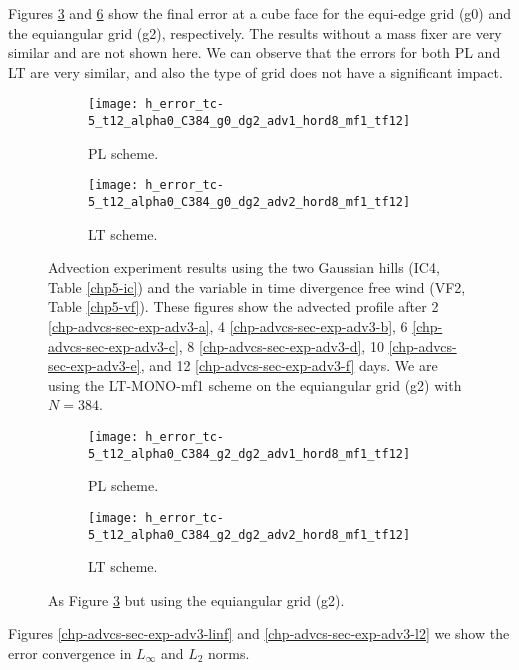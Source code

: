 Figures \ref{chp-advcs-sec-exp-adv3-errors-0} and \ref{chp-advcs-sec-exp-adv3-errors-2} show 
the final error at a cube face for the equi-edge grid (g0) and the equiangular grid (g2), respectively.
The results without a mass fixer are very similar and are not shown here. 
We can observe that the errors for both PL and LT are very similar, and also the type of grid does not have a significant impact.
\newpage
\begin{figure}[!htb]
	\centering
	\begin{subfigure}{0.45\textwidth}
		\centering
		\texttt{[image: h\_error\_tc-5\_t12\_alpha0\_C384\_g0\_dg2\_adv1\_hord8\_mf1\_tf12]}
		\caption{PL scheme.\label{chp-advcs-sec-exp-adv3-errors-0a}}
	\end{subfigure}
	\begin{subfigure}{0.45\textwidth}
		\centering
		\texttt{[image: h\_error\_tc-5\_t12\_alpha0\_C384\_g0\_dg2\_adv2\_hord8\_mf1\_tf12]}
		\caption{LT scheme.\label{chp-advcs-sec-exp-adv3-errors-0b}}
	\end{subfigure}
	\caption{
Advection experiment results using the two Gaussian hills  (IC4, Table \ref{chp5-ic}) and 
the variable in time divergence free wind (VF2, Table \ref{chp5-vf}).
These figures show the advected profile after
2 \eqref{chp-advcs-sec-exp-adv3-a}, 
4  \eqref{chp-advcs-sec-exp-adv3-b},
6  \eqref{chp-advcs-sec-exp-adv3-c},
8  \eqref{chp-advcs-sec-exp-adv3-d},
10  \eqref{chp-advcs-sec-exp-adv3-e},
and 12  \eqref{chp-advcs-sec-exp-adv3-f} days.
We are using the LT-MONO-mf1 scheme on the equiangular grid (g2) with $N=384$.
		 \label{chp-advcs-sec-exp-adv3-errors-0}}
\end{figure}
\begin{figure}[!htb]
	\centering
	\begin{subfigure}{0.45\textwidth}
		\centering
		\texttt{[image: h\_error\_tc-5\_t12\_alpha0\_C384\_g2\_dg2\_adv1\_hord8\_mf1\_tf12]}
		\caption{PL scheme.\label{chp-advcs-sec-exp-adv3-errors-2a}}
	\end{subfigure}
	\begin{subfigure}{0.45\textwidth}
		\centering
		\texttt{[image: h\_error\_tc-5\_t12\_alpha0\_C384\_g2\_dg2\_adv2\_hord8\_mf1\_tf12]}
		\caption{LT scheme.\label{chp-advcs-sec-exp-adv3-errors-2b}}
	\end{subfigure}
	\caption{As Figure \ref{chp-advcs-sec-exp-adv3-errors-0} but using the equiangular grid (g2).\label{chp-advcs-sec-exp-adv3-errors-2}}
\end{figure}
Figures \ref{chp-advcs-sec-exp-adv3-linf} and \ref{chp-advcs-sec-exp-adv3-l2} we show the error convergence in $L_{\infty}$ and $L_{2}$ norms.
